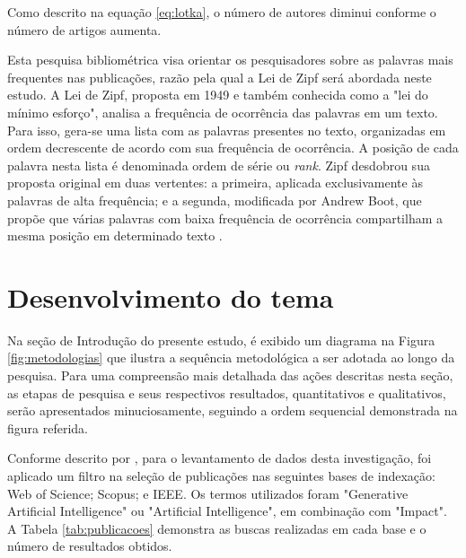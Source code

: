 \documentclass[openany,oneside,a4paper,11pt]{extarticle}
\begin{document}
Como descrito na equação \ref{eq:lotka}, o número de autores diminui conforme o número de artigos aumenta.

Esta pesquisa bibliométrica visa orientar os pesquisadores sobre as palavras mais frequentes nas publicações, razão pela qual a Lei de Zipf será abordada neste estudo. A Lei de Zipf, proposta em 1949 e também conhecida como a "lei do mínimo esforço", analisa a frequência de ocorrência das palavras em um texto. Para isso, gera-se uma lista com as palavras presentes no texto, organizadas em ordem decrescente de acordo com sua frequência de ocorrência. A posição de cada palavra nesta lista é denominada ordem de série ou \textit{rank}. Zipf desdobrou sua proposta original em duas vertentes: a primeira, aplicada exclusivamente às palavras de alta frequência; e a segunda, modificada por Andrew Boot, que propõe que várias palavras com baixa frequência de ocorrência compartilham a mesma posição em determinado texto \cite{gracio2020topicos}.

\section{Desenvolvimento do tema}

Na seção de Introdução do presente estudo, é exibido um diagrama na Figura \ref{fig:metodologias} que ilustra a sequência metodológica a ser adotada ao longo da pesquisa. Para uma compreensão mais detalhada das ações descritas nesta seção, as etapas de pesquisa e seus respectivos resultados, quantitativos e qualitativos, serão apresentados minuciosamente, seguindo a ordem sequencial demonstrada na figura referida.

Conforme descrito por \textcite{zupic2015bibliometric}, para o levantamento de dados desta investigação, foi aplicado um filtro na seleção de publicações nas seguintes bases de indexação: Web of Science; Scopus; e IEEE. Os termos utilizados foram "Generative Artificial Intelligence" ou "Artificial Intelligence", em combinação com "Impact". A Tabela \ref{tab:publicacoes} demonstra as buscas realizadas em cada base e o número de resultados obtidos.
\end{document}
